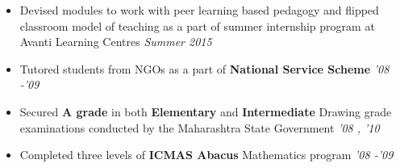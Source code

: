 \documentclass[10pt]{article}%
\newcommand{\xfilll}[2][1ex]{
\dimen0=#2\advance\dimen0 by #1
\leaders\hrule height \dimen0 depth -#1\hfill}
\begin{document}
{
\begin{itemize}
\vspace{-4mm}
\setlength\itemsep{0.01em}
    \item Devised modules to work with peer learning based pedagogy and flipped classroom model of teaching as a part of summer internship program at Avanti Learning Centres \hfill\textit{Summer 2015}
    \item Tutored students from NGOs as a part of \textbf{National Service Scheme} \hfill\textit{'08 -'09} 
    \item Secured \textbf{A grade} in both \textbf{Elementary} and \textbf{Intermediate} Drawing grade examinations conducted by the Maharashtra State Government \hfill\textit{'08 , '10}
    \item Completed three levels of \textbf{ICMAS Abacus} Mathematics program \hfill\textit{'08 -'09}
    
\end{itemize}

}
\end{document}
